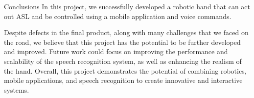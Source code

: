 \documentclass[final, 20pt]{beamer}
\newlength{\colwidth}
\begin{document}
\begin{frame}[t]
\begin{columns}[t]
\begin{column}{\colwidth}
      \begin{block}{Conclusions}
        In this project, we successfully developed a robotic hand that can act out ASL and be controlled using a mobile application and voice commands.

        Despite defects in the final product, along with many challenges that we faced on the road, we believe that this project has the potential to be further developed and improved. Future work could focus on improving the performance and scalability of the speech recognition system, as well as enhancing the realism of the hand. Overall, this project demonstrates the potential of combining robotics, mobile applications, and speech recognition to create innovative and interactive systems.
      \end{block}
    \end{column}

    \margincolumn
  \end{columns}

\end{frame}
\end{document}

